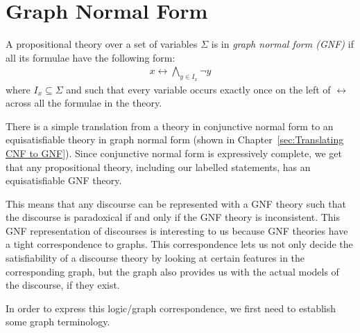 
\section{Graph Normal Form}
\label{sec:Graph Normal Form}
A propositional theory over a set of variables $\Sigma$ is in \textit{graph normal form (GNF)}\cite{apal-digraph} if all its formulae have the following form:
\begin{align}
  x \leftrightarrow \bigwedge_{y \in I_x} \neg y
\end{align}
where $I_x \subseteq \Sigma$ and such that every variable occurs exactly once on the left of $\leftrightarrow$ across all the formulae in the theory.

There is a simple translation from a theory in conjunctive normal form to an equisatisfiable theory in graph normal form (shown in Chapter~\ref{sec:Translating CNF to GNF}).
Since conjunctive normal form is expressively complete, we get that any propositional theory, including our labelled statements, has an equisatisfiable GNF theory.

This means that any discourse can be represented with a GNF theory such that the discourse is paradoxical if and only if the GNF theory is inconsistent.
This GNF representation of discourses is interesting to us because GNF theories have a tight correspondence to graphs.
This correspondence lets us not only decide the satisfiability of a discourse theory by looking at certain features in the corresponding graph, but the graph also provides us with the actual models of the discourse, if they exist.

In order to express this logic/graph correspondence, we first need to establish some graph terminology.
